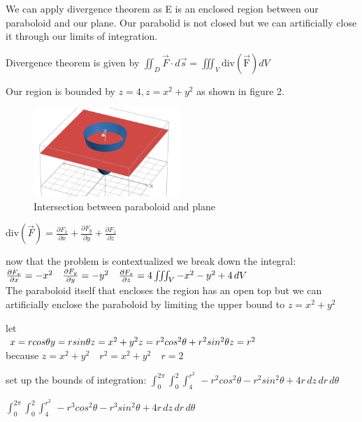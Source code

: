 \documentclass[12pt]{amsart}
\newcommand{\surfint}[1]{\iint_D {#1} \cdot d\vec{s}}
\newcommand{\diver}[1]{\frac{\partial F_{#1}}{\partial {#1}}}
\begin{document}
We can apply divergence theorem as E is an enclosed region between our paraboloid and our plane. Our parabolid is not closed but we can artificially close it through our limits of 
integration. 

Divergence theorem is given by $\surfint{\vec{F}} = \iiint_V \mathrm{div(\vec{F})} dV$

Our region is bounded by $z = 4 , z = x^2 + y^2$ as shown in figure 2. 

\begin{figure}[H]
\includegraphics[width=0.5\textwidth]{Figure2.png}  
\caption{Intersection between paraboloid and plane}
\label{figure2}  
\end{figure}

$\mathrm{div}(\vec{F})= \diver{x} + \diver{y} + \diver{z}$

now that the problem is contextualized we break down the integral: \\
$\diver{x} = - x^2 \quad \diver{y} = -y^2 \quad \diver{z} = 4 \\
\iiint_V -x^2 - y^2 + 4 \, dV $ 
\\

The paraboloid itself that encloses the region has an open top but we can artificially enclose the paraboloid by limiting the upper bound to $z = x^2 + y^2$

let \\
$ x = rcos\theta \\ y = rsin\theta \\ z = x^2 + y^2 \\ z = r^2cos^2\theta + r^2sin^2\theta \\ z = r^2$ \\ 
because $z = x^2 + y^2 \quad r^2 = x^2 + y^2 \quad r = 2$ 

set up the bounds of integration: 
$ \int_{0}^{2\pi} \int_{0}^{2} \int_{4}^{r^2} \, -r^2cos^2\theta - r^2sin^2\theta + 4 r \, dz \, dr \, d\theta$

$ \int_{0}^{2\pi} \int_{0}^{2} \int_{4}^{r^2} \, -r^3cos^2\theta - r^3sin^2\theta + 4r \, dz \, dr \, d\theta$
\end{document}
